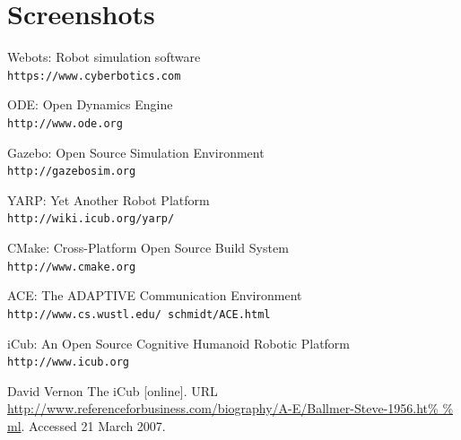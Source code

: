 \documentclass[a4paper, 11pt]{report}
\begin{document}
\chapter{Screenshots}
  
  \begin{thebibliography}{9}
    Webots: Robot simulation software
    \\\texttt{https://www.cyberbotics.com}
    
    ODE: Open Dynamics Engine
    \\\texttt{http://www.ode.org}
    
    Gazebo: Open Source Simulation Environment
    \\\texttt{http://gazebosim.org}
    
    YARP: Yet Another Robot Platform 
    \\\texttt{http://wiki.icub.org/yarp/}
    
    CMake: Cross-Platform Open Source Build System 
    \\\texttt{http://www.cmake.org}
    
    ACE: The ADAPTIVE Communication Environment
    \\\texttt{http://www.cs.wustl.edu/~schmidt/ACE.html}
    
    iCub: An Open Source Cognitive Humanoid Robotic Platform
    \\\texttt{http://www.icub.org}
    
     David Vernon The iCub [online]. 
    URL 
    \url{http://www.referenceforbusiness.com/biography/A-E/Ballmer-Steve-1956.ht%
    
  \end{thebibliography}
  
\end{document}
